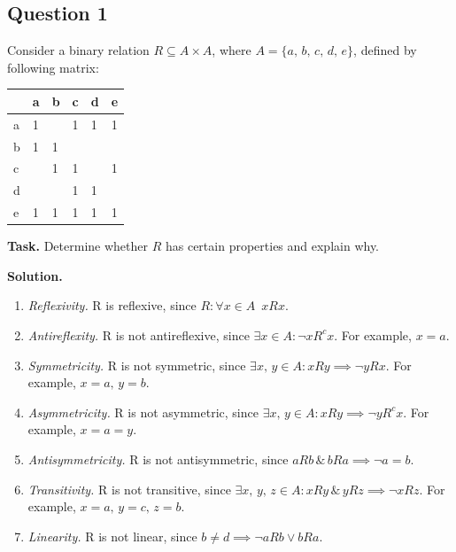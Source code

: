 \documentclass[14pt,a4paper]{extarticle}
\begin{document}
	\maketitle
	
	\subsection*{Question 1}
	Consider a binary relation $R\subseteq A\times A$, where $A=\{a,\,b,\,c,\,d,\,e\}$, defined by following matrix:
	\begin{center}
	\begin{tabu}{ |X[c]|X[c]|X[c]|X[c]|X[c]|X[c]|}
		\hline
		 & a & b & c & d & e\\
		\hline
		a & 1 &  & 1 & 1 & 1\\
		\hline
		b & 1 & 1 &  &  & \\
		\hline
		c &  & 1 & 1 &  & 1\\
		\hline
		d &  &  & 1 & 1 & \\
		\hline
		e & 1 & 1 & 1 & 1 & 1\\
		\hline
	\end{tabu}
	\end{center}
	
	 \noindent\textbf{Task.} Determine whether $R$ has certain properties and explain why.
	 
	 \noindent\textbf{Solution.}
	 
	 \begin{enumerate}
	 	\item \textit{Reflexivity.} R is reflexive, since $R:\forall x\in A \,\,\, xRx$.
	 	\item \textit{Antireflexity.} R is not antireflexive, since $\exists x\in A: \lnot xR^{c}x$. For example, $x=a$. 
	 	\item \textit{Symmetricity.} R is not symmetric, since $\exists x,\, y\in A: xRy \implies \lnot yRx$. For example, $x=a,\, y=b$. 
	 	\item \textit{Asymmetricity.} R is not asymmetric, since $\exists x,\, y\in A: xRy \implies \lnot yR^{c}x$. For example, $x = a = y$.
	 	\item \textit{Antisymmetricity.} R is not antisymmetric, since $aRb\, \&\, bRa \implies \lnot a=b$.
	 	\item \textit{Transitivity.} R is not transitive, since $\exists x,\, y,\, z\in A: xRy\, \& \, yRz \implies \lnot xRz$. For example, $x=a,\, y=c,\, z=b$. 
	 	\item \textit{Linearity.} R is not linear, since $b\neq d \implies \lnot aRb\lor bRa$.
	 \end{enumerate}
	 \newpage
	 
\end{document}
